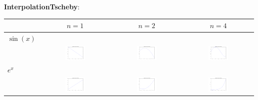 \documentclass[11pt,a4paper,ngerman]{article}
\begin{document}
\textbf{InterpolationTscheby}:\\
\begin{tabular}{l|ccc}
 & $n = 1$ & $n = 2$ & $n = 4$ \\
\hline
$\sin(x)$ & & & \\
 & \includegraphics[width=0.3\textwidth]{plot4_1.png} & \includegraphics[width=0.3\textwidth]{plot4_2.png} & \includegraphics[width=0.3\textwidth]{plot4_4.png} \\
$e^x$ & & & \\
 & \includegraphics[width=0.3\textwidth]{plot3_1.png} & \includegraphics[width=0.3\textwidth]{plot3_2.png} & \includegraphics[width=0.3\textwidth]{plot3_4.png} \\
\end{tabular}
\end{document}
